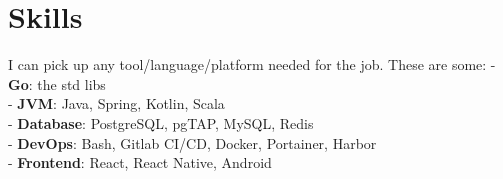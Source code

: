 \section*{Skills}
{ %
  I can pick up any tool/language/platform needed for the job.
  These are some:
  \break
  - \textbf{Go}: the std libs\\
  - \textbf{JVM}: Java, Spring, Kotlin, Scala \\
  - \textbf{Database}: PostgreSQL, pgTAP, MySQL, Redis \\
  - \textbf{DevOps}: Bash, Gitlab CI/CD, Docker, Portainer, Harbor\\
  - \textbf{Frontend}: React, React Native, Android
}
